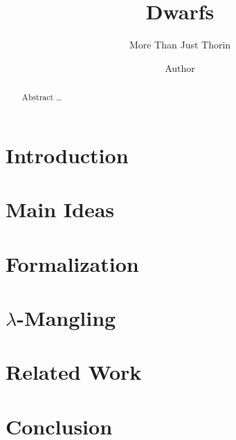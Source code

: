 \documentclass[acmsmall,nonacm=true,screen=true,timestamp=true]{acmart}
\begin{document}
\title{Dwarfs}
\subtitle{More Than Just Thorin}
\author{Author}

\begin{abstract}
  Abstract \ldots
\end{abstract}

\maketitle



\section{Introduction}
\label{sec:intro}


\section{Main Ideas}
\label{sec:mainideas}


\section{Formalization}
\label{sec:formalization}


\section{$\lambda$-Mangling}
\label{sec:lammangle}


\section{Related Work}
\label{sec:relatedwork}


\section{Conclusion}
\label{sec:conclusion}



\end{document}
